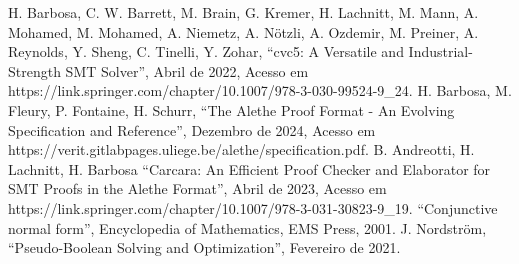 \documentclass[conference]{IEEEtran}
\begin{document}
\begin{thebibliography}{00}
              H. Barbosa, C. W. Barrett, M. Brain, G. Kremer, H. Lachnitt, M. Mann, A. Mohamed, M. Mohamed, A. Niemetz, A. Nötzli, A. Ozdemir, M. Preiner, A. Reynolds, Y. Sheng, C. Tinelli, Y. Zohar, ``cvc5: A Versatile and Industrial-Strength SMT Solver'', Abril de 2022, Acesso em https://link.springer.com/chapter/10.1007/978-3-030-99524-9\_24.
            H. Barbosa, M. Fleury, P. Fontaine, H. Schurr, ``The Alethe Proof Format - An Evolving Specification and Reference'', Dezembro de 2024, Acesso em https://verit.gitlabpages.uliege.be/alethe/specification.pdf.
           B. Andreotti, H. Lachnitt, H. Barbosa ``Carcara: An Efficient Proof Checker and Elaborator for SMT Proofs in the Alethe Format'', Abril de 2023, Acesso em https://link.springer.com/chapter/10.1007/978-3-031-30823-9\_19.
               ``Conjunctive normal form'', Encyclopedia of Mathematics, EMS Press, 2001.
           J. Nordström, ``Pseudo-Boolean Solving and Optimization'', Fevereiro de 2021.
\end{thebibliography}

\newpage
\onecolumn
\appendix
\end{document}
